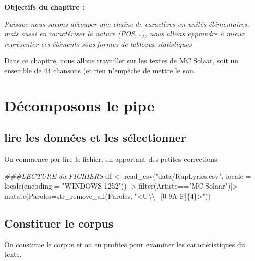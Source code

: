 \documentclass[
  letterpaper,
  DIV=11,
  numbers=noendperiod]{scrreprt}
\newenvironment{Shaded}{\begin{snugshade}}{\end{snugshade}}
\newcommand{\AttributeTok}[1]{\textcolor[rgb]{0.40,0.45,0.13}{#1}}
\newcommand{\DocumentationTok}[1]{\textcolor[rgb]{0.37,0.37,0.37}{\textit{#1}}}
\newcommand{\FunctionTok}[1]{\textcolor[rgb]{0.28,0.35,0.67}{#1}}
\newcommand{\NormalTok}[1]{\textcolor[rgb]{0.00,0.23,0.31}{#1}}
\newcommand{\OtherTok}[1]{\textcolor[rgb]{0.00,0.23,0.31}{#1}}
\newcommand{\SpecialCharTok}[1]{\textcolor[rgb]{0.37,0.37,0.37}{#1}}
\newcommand{\StringTok}[1]{\textcolor[rgb]{0.13,0.47,0.30}{#1}}
\begin{document}
\textbf{Objectifs du chapitre :}

\emph{Puisque nous savons découper une chaîne de caractères en unités
élémentaires, mais aussi en caractériser la nature (POS,\ldots), nous
allons apprendre à mieux représenter ces éléments sous formes de
tableaux statistiques}

Dans ce chapitre, nous allons travailler sur les textes de MC Solaar,
soit un ensemble de 44 chansons (et rien n'empêche de
\href{https://www.youtube.com/watch?v=22-kiKkc614}{mettre le son}.

\section{Décomposons le pipe}\label{duxe9composons-le-pipe}

\subsection{lire les données et les
sélectionner}\label{lire-les-donnuxe9es-et-les-suxe9lectionner}

On commence par lire le fichier, en apportant des petites corrections.

\begin{Shaded}
\begin{Highlighting}[]
\DocumentationTok{\#\#\#LECTURE du FICHIERS}
\NormalTok{df }\OtherTok{\textless{}{-}} \FunctionTok{read\_csv}\NormalTok{(}\StringTok{"data/RapLyrics.csv"}\NormalTok{, }
    \AttributeTok{locale =} \FunctionTok{locale}\NormalTok{(}\AttributeTok{encoding =} \StringTok{"WINDOWS{-}1252"}\NormalTok{)) }\SpecialCharTok{|\textgreater{}}
  \FunctionTok{filter}\NormalTok{(Artiste}\SpecialCharTok{==}\StringTok{"MC Solaar"}\NormalTok{)}\SpecialCharTok{|\textgreater{}}
  \FunctionTok{mutate}\NormalTok{(}\AttributeTok{Paroles=}\FunctionTok{str\_remove\_all}\NormalTok{(Paroles, }\StringTok{"\textless{}U}\SpecialCharTok{\textbackslash{}\textbackslash{}}\StringTok{+[0{-}9A{-}F]\{4\}\textgreater{}"}\NormalTok{))}
\end{Highlighting}
\end{Shaded}

\subsection{Constituer le corpus}\label{constituer-le-corpus}

On constitue le corpus et on en profites pour examiner les
caractéristiques du texte.
\end{document}
